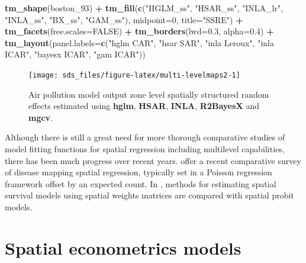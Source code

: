 \documentclass[]{book}
\newenvironment{Shaded}{\begin{snugshade}}{\end{snugshade}}
\newcommand{\DataTypeTok}[1]{\textcolor[rgb]{0.13,0.29,0.53}{#1}}
\newcommand{\DecValTok}[1]{\textcolor[rgb]{0.00,0.00,0.81}{#1}}
\newcommand{\FloatTok}[1]{\textcolor[rgb]{0.00,0.00,0.81}{#1}}
\newcommand{\KeywordTok}[1]{\textcolor[rgb]{0.13,0.29,0.53}{\textbf{#1}}}
\newcommand{\NormalTok}[1]{#1}
\newcommand{\OperatorTok}[1]{\textcolor[rgb]{0.81,0.36,0.00}{\textbf{#1}}}
\newcommand{\OtherTok}[1]{\textcolor[rgb]{0.56,0.35,0.01}{#1}}
\newcommand{\StringTok}[1]{\textcolor[rgb]{0.31,0.60,0.02}{#1}}
\begin{document}
\begin{Shaded}
\begin{Highlighting}[]
\KeywordTok{tm_shape}\NormalTok{(boston_}\DecValTok{93}\NormalTok{) }\OperatorTok{+}\StringTok{ }\KeywordTok{tm_fill}\NormalTok{(}\KeywordTok{c}\NormalTok{(}\StringTok{"HGLM_ss"}\NormalTok{, }\StringTok{"HSAR_ss"}\NormalTok{, }\StringTok{"INLA_lr"}\NormalTok{, }\StringTok{"INLA_ss"}\NormalTok{, }\StringTok{"BX_ss"}\NormalTok{,}
    \StringTok{"GAM_ss"}\NormalTok{), }\DataTypeTok{midpoint=}\DecValTok{0}\NormalTok{, }\DataTypeTok{title=}\StringTok{"SSRE"}\NormalTok{)  }\OperatorTok{+}\StringTok{ }\KeywordTok{tm_facets}\NormalTok{(}\DataTypeTok{free.scales=}\OtherTok{FALSE}\NormalTok{) }\OperatorTok{+}\StringTok{ }
\StringTok{    }\KeywordTok{tm_borders}\NormalTok{(}\DataTypeTok{lwd=}\FloatTok{0.3}\NormalTok{, }\DataTypeTok{alpha=}\FloatTok{0.4}\NormalTok{) }\OperatorTok{+}\StringTok{ }\KeywordTok{tm_layout}\NormalTok{(}\DataTypeTok{panel.labels=}\KeywordTok{c}\NormalTok{(}\StringTok{"hglm CAR"}\NormalTok{, }\StringTok{"hsar SAR"}\NormalTok{,}
        \StringTok{"inla Leroux"}\NormalTok{, }\StringTok{"inla ICAR"}\NormalTok{, }\StringTok{"bayesx ICAR"}\NormalTok{, }\StringTok{"gam ICAR"}\NormalTok{))}
\end{Highlighting}
\end{Shaded}

\begin{figure}

{\centering \texttt{[image: sds\_files/figure-latex/multi-levelmaps2-1]} 

}

\caption{Air pollution model output zone level spatially structured random effects estimated using \textbf{hglm}, \textbf{HSAR}, \textbf{INLA}, \textbf{R2BayesX} and \textbf{mgcv}.}\label{fig:multi-levelmaps2}
\end{figure}

Although there is still a great need for more thorough comparative studies of model fitting functions for spatial regression including multilevel capabilities, there has been much progress over recent years. \citet{VRANCKX2019100302} offer a recent comparative survey of disease mapping spatial regression, typically set in a Poisson regression framework offset by an expected count. In \citet{doi:10.1177/1471082X20967158}, methods for estimating spatial survival models using spatial weights matrices are compared with spatial probit models.

\hypertarget{spatecon}{%
\chapter{Spatial econometrics models}\label{spatecon}}
\end{document}
